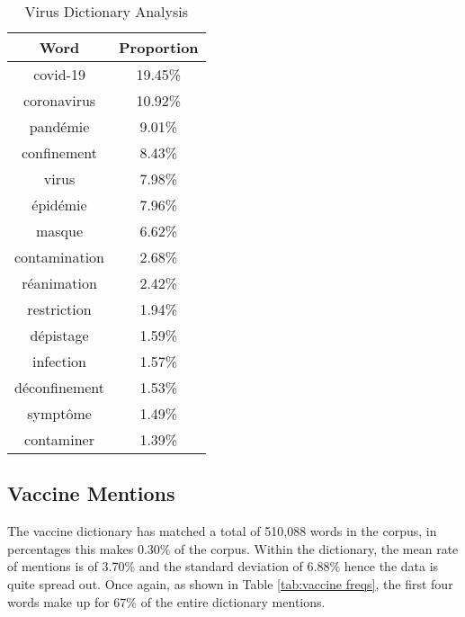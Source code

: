 \begin{table}[H]
\caption{Virus Dictionary Analysis}
\label{tab:virus freqs}
\centering
\begin{tabular}{@{}cc@{}}
\toprule
Word      & Proportion \\ \midrule
covid-19      & 19.45\% \\
coronavirus   & 10.92\% \\
pandémie      & 9.01\%  \\
confinement   & 8.43\%  \\
virus         & 7.98\%  \\
épidémie      & 7.96\%  \\
masque        & 6.62\%  \\
contamination & 2.68\%  \\
réanimation   & 2.42\%  \\
restriction   & 1.94\%  \\
dépistage     & 1.59\%  \\
infection     & 1.57\%  \\
déconfinement & 1.53\%  \\
symptôme      & 1.49\%  \\
contaminer    & 1.39\%  \\ \bottomrule
\end{tabular}
\end{table}

\subsection{Vaccine Mentions}

The vaccine dictionary has matched a total of 510,088 words in the corpus, in percentages this makes 0.30\% of the corpus. Within the dictionary, the mean rate of mentions is of 3.70\% and the standard deviation of 6.88\% hence the data is quite spread out. Once again, as shown in Table \ref{tab:vaccine freqs}, the first four words make up for 67\% of the entire dictionary mentions.

